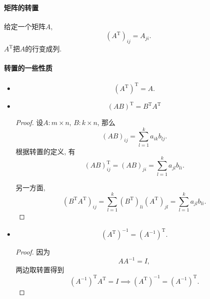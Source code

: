 
\paragraph{矩阵的转置}
\begin{definition}
    给定一个矩阵$A$,
    \begin{equation}
      \left( A^{\mathrm{T}} \right) _{ij}=A_{ji}.
    \end{equation}
    $A^{\mathrm{T}}$把$A$的行变成列.
\end{definition}

\paragraph{转置的一些性质}
\begin{itemize}
    \item \begin{equation}
        \left( A^{\mathrm{T}} \right) ^{\mathrm{T}} = A.
      \end{equation}
    
    \item \begin{equation}
        \left( AB \right) ^{\mathrm{T}} = B^{\mathrm{T}}A^{\mathrm{T}}
      \end{equation}
    \begin{proof}
          设$A\colon m \times n$, $B\colon k \times n$, 那么
          \begin{equation}
            \left( AB \right) _{ij} = \sum_{l=1}^{k} a_{ik}b_{lj}.
          \end{equation}
          根据转置的定义, 有
          \begin{equation}
            \left( AB \right) ^{\mathrm{T}}_{ij} = \left( AB \right) _{ji} = \sum_{l=1}^{k} a_{jl} b_{li}.
          \end{equation}
      
          另一方面,
          \begin{equation}
            \left( B^{\mathrm{T}}A^{\mathrm{T}} \right) _{ij} = \sum_{l=1}^{k} \left( B^{\mathrm{T}} \right) _{li} \left( A^{\mathrm{T}} \right) _{jl} = \sum_{l=1}^{k} a_{jl} b_{li}.
          \end{equation}
    \end{proof}

    \item \begin{equation}
        \left( A^{\mathrm{T}} \right) ^{-1} = \left( A^{-1} \right) ^{\mathrm{T}}.
      \end{equation}
      \begin{proof}
          因为
          \begin{equation}
            A A^{-1} = I,
          \end{equation}
          两边取转置得到
          \begin{equation}
            \left( A^{-1} \right) ^{\mathrm{T}} A^{\mathrm{T}} = I \implies \left( A^{\mathrm{T}} \right) ^{-1} = \left( A^{-1} \right) ^{\mathrm{T}}.
          \end{equation}
      \end{proof}
\end{itemize}


